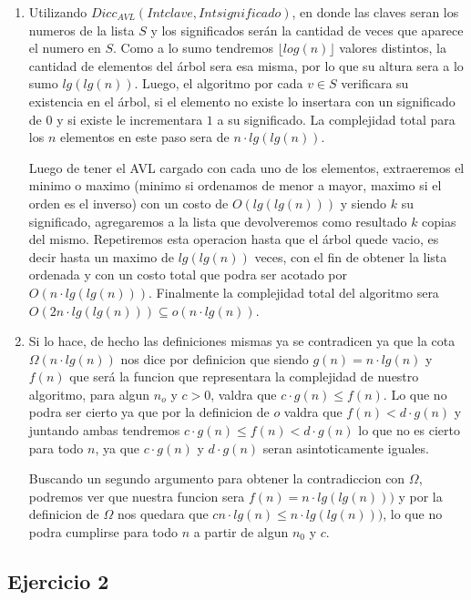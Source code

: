\documentclass[10pt, a4paper]{article}
\begin{document}
\begin{enumerate}
 \item Utilizando $Dicc_{AVL}(Int clave, Int significado)$, en donde las claves seran los numeros de la lista $S$ y los significados ser\'an la cantidad de veces que aparece el numero en $S$. Como a lo sumo tendremos $\lfloor log(n) \rfloor$ valores distintos, la cantidad de elementos del \'arbol sera esa misma, por lo que su altura sera a lo sumo $lg(lg(n))$. Luego, el algoritmo por cada $v \in S$ verificara su existencia en el \'arbol, si el elemento no existe lo insertara con un significado de $0$ y si existe le incrementara $1$ a su significado. La complejidad total para los $n$ elementos en este paso sera de $n \cdot lg(lg(n))$. 
 
 Luego de tener el AVL cargado con cada uno de los elementos, extraeremos el minimo o maximo (minimo si ordenamos de menor a mayor, maximo si el orden es el inverso) con un costo de $O(lg(lg(n)))$ y siendo $k$ su significado, agregaremos a la lista que devolveremos como resultado $k$ copias del mismo. Repetiremos esta operacion hasta que el \'arbol quede vacio, es decir hasta un maximo de $lg(lg(n))$ veces, con el fin de obtener la lista ordenada y con un costo total que podra ser acotado por $O(n \cdot lg(lg(n)))$. Finalmente la complejidad total del algoritmo sera $O(2n \cdot lg(lg(n))) \subseteq o(n\cdot lg(n))$.
 
 \item Si lo hace, de hecho las definiciones mismas ya se contradicen ya que la cota $\Omega(n\cdot lg(n))$ nos dice por definicion que siendo $g(n) = n\cdot lg(n)$ y $f(n)$ que ser\'a la funcion que representara la complejidad de nuestro algoritmo, para algun $n_o$ y $c>0$, valdra que $c\cdot g(n) \leq f(n)$. Lo que no podra ser cierto ya que por la definicion de $o$ valdra que $f(n) < d\cdot g(n)$ y juntando ambas tendremos $c\cdot g(n) \leq f(n) < d\cdot g(n)$ lo que no es cierto para todo $n$, ya que $c\cdot g(n)$ y $d\cdot g(n)$ seran asintoticamente iguales.
 
 Buscando un segundo argumento para obtener la contradiccion con $\Omega$, podremos ver que nuestra funcion sera $f(n) = n \cdot lg(lg(n)))$ y por la definicion de $\Omega$ nos quedara que $cn\cdot lg(n) \leq n \cdot lg(lg(n)))$, lo que no podra cumplirse para todo $n$ a partir de algun $n_0$ y $c$.
 
 
\end{enumerate}


\subsection*{Ejercicio 2}
\end{document}
